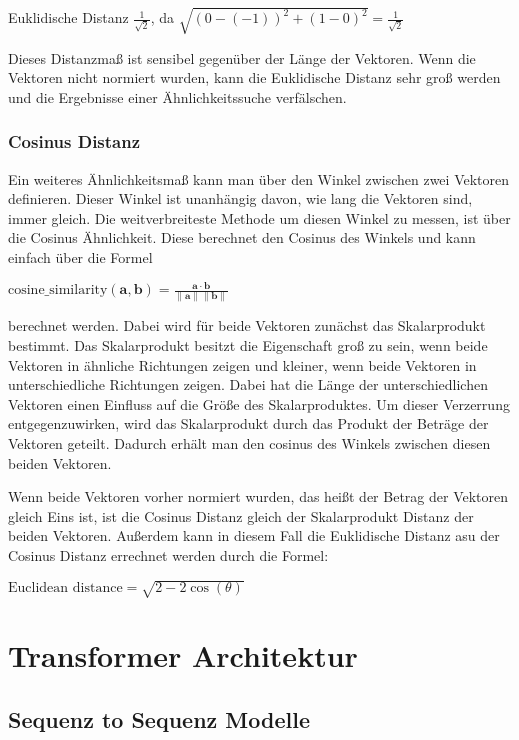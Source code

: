 Euklidische Distanz $\frac{1}{\sqrt{2}}$, da $\sqrt{(0-(-1))^2 + (1-0)^2}=\frac{1}{\sqrt{2}}$

Dieses Distanzmaß ist sensibel gegenüber der Länge der Vektoren.
Wenn die Vektoren nicht normiert wurden, kann die Euklidische Distanz sehr groß werden und die Ergebnisse einer Ähnlichkeitssuche verfälschen.


\subsubsection{Cosinus Distanz}

Ein weiteres Ähnlichkeitsmaß kann man über den Winkel zwischen zwei Vektoren definieren.
Dieser Winkel ist unanhängig davon, wie lang die Vektoren sind, immer gleich.
Die weitverbreiteste Methode um diesen Winkel zu messen, ist über die Cosinus Ähnlichkeit.
Diese berechnet den Cosinus des Winkels und kann einfach über die Formel

$\text{cosine\_similarity}(\mathbf{a}, \mathbf{b}) = \frac{\mathbf{a} \cdot \mathbf{b}}{\|\mathbf{a}\| \|\mathbf{b}\|}$

berechnet werden.
Dabei wird für beide Vektoren zunächst das Skalarprodukt bestimmt.
Das Skalarprodukt besitzt die Eigenschaft groß zu sein, wenn beide Vektoren in ähnliche Richtungen zeigen und kleiner, wenn beide Vektoren in unterschiedliche Richtungen zeigen.
Dabei hat die Länge der unterschiedlichen Vektoren einen Einfluss auf die Größe des Skalarproduktes.
Um dieser Verzerrung entgegenzuwirken, wird das Skalarprodukt durch das Produkt der Beträge der Vektoren geteilt.
Dadurch erhält man den cosinus des Winkels zwischen diesen beiden Vektoren.

Wenn beide Vektoren vorher normiert wurden, das heißt der Betrag der Vektoren gleich Eins ist, ist die Cosinus Distanz gleich der Skalarprodukt Distanz der beiden Vektoren.
Außerdem kann in diesem Fall die Euklidische Distanz asu der Cosinus Distanz errechnet werden durch die Formel: 

$\text{Euclidean distance} = \sqrt{2 - 2 \cos(\theta)}$

\section{Transformer Architektur}

\subsection{Sequenz to Sequenz Modelle}

